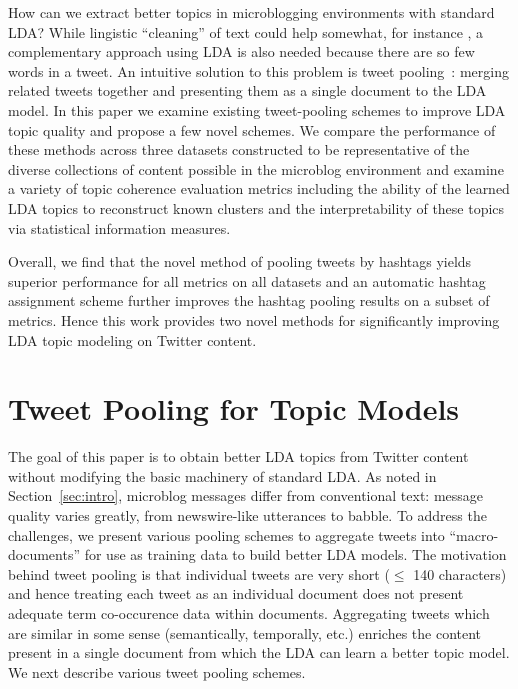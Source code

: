 \documentclass{sig-alternate}
\begin{document}
How can we extract better topics in microblogging environments with
standard LDA?  While lingistic ``cleaning'' of text could help
somewhat, for instance \cite{Han2012}, a complementary approach using
LDA is also needed because there are so few words in a tweet.  An
intuitive solution to this problem is tweet
pooling~\cite{Weng2010wsdm,hong}: merging related tweets together and
presenting them as a single document to the LDA model.  In this paper
we examine existing tweet-pooling schemes to improve LDA topic quality
and propose a few novel schemes.  We compare the performance of these
methods across three datasets constructed to be representative of the
diverse collections of content possible in the microblog environment
and examine a variety of topic coherence evaluation metrics including
the ability of the learned LDA topics to reconstruct known clusters
and the interpretability of these topics via statistical information
measures.

Overall, we find that the novel method of pooling tweets by hashtags
yields superior performance for all metrics on all datasets and an
automatic hashtag assignment scheme further improves the hashtag
pooling results on a subset of metrics.  Hence this work provides two
novel methods for significantly improving LDA topic modeling on
Twitter content.



\section{Tweet Pooling for Topic Models}

\label{sec:pooling}

The goal of this paper is to obtain better LDA topics from Twitter
content without modifying the basic machinery of standard LDA.  As
noted in Section~\ref{sec:intro}, microblog messages differ from
conventional text: message quality varies greatly, from newswire-like
utterances to babble.  To address the challenges, we present various
pooling schemes to aggregate tweets into ``macro-documents'' for use
as training data to build better LDA models.  The motivation behind
tweet pooling is that individual tweets are very short ($\leq$ 140
characters) and hence treating each tweet as an individual document
does not present adequate term co-occurence data within documents.
Aggregating tweets which are similar in some sense (semantically,
temporally, etc.) enriches the content present in a single document
from which the LDA can learn a better topic model.  We next describe
various tweet pooling schemes.
\end{document}
